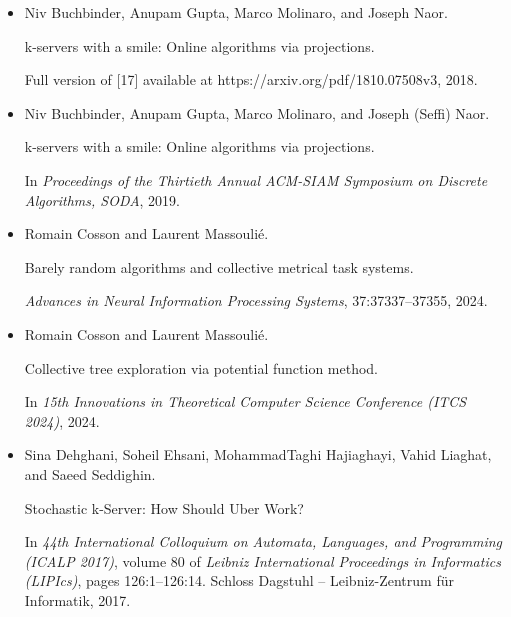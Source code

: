 \documentclass[10pt,a4paper]{article}
\begin{document}
\begin{itemize}
\item[] 
[16]

Niv Buchbinder, Anupam Gupta, Marco Molinaro, and Joseph Naor.


k-servers with a smile: Online algorithms via projections.


Full version of [17] available at
https://arxiv.org/pdf/1810.07508v3, 2018.





\item[] 
[17]

Niv Buchbinder, Anupam Gupta, Marco Molinaro, and Joseph (Seffi) Naor.


k-servers with a smile: Online algorithms via projections.


In \emph{Proceedings of the Thirtieth Annual ACM-SIAM Symposium on
Discrete Algorithms, SODA}, 2019.





\item[] 
[18]

Romain Cosson and Laurent Massoulié.


Barely random algorithms and collective metrical task systems.


\emph{Advances in Neural Information Processing Systems},
37:37337–37355, 2024.





\item[] 
[19]

Romain Cosson and Laurent Massoulié.


Collective tree exploration via potential function method.


In \emph{15th Innovations in Theoretical Computer Science Conference
(ITCS 2024)}, 2024.





\item[] 
[20]

Sina Dehghani, Soheil Ehsani, MohammadTaghi Hajiaghayi, Vahid Liaghat, and
Saeed Seddighin.


Stochastic k-Server: How Should Uber Work?


In \emph{44th International Colloquium on Automata, Languages, and
Programming (ICALP 2017)}, volume 80 of \emph{Leibniz International
Proceedings in Informatics (LIPIcs)}, pages 126:1–126:14. Schloss Dagstuhl
– Leibniz-Zentrum für Informatik, 2017.



\end{itemize}
\end{document}
